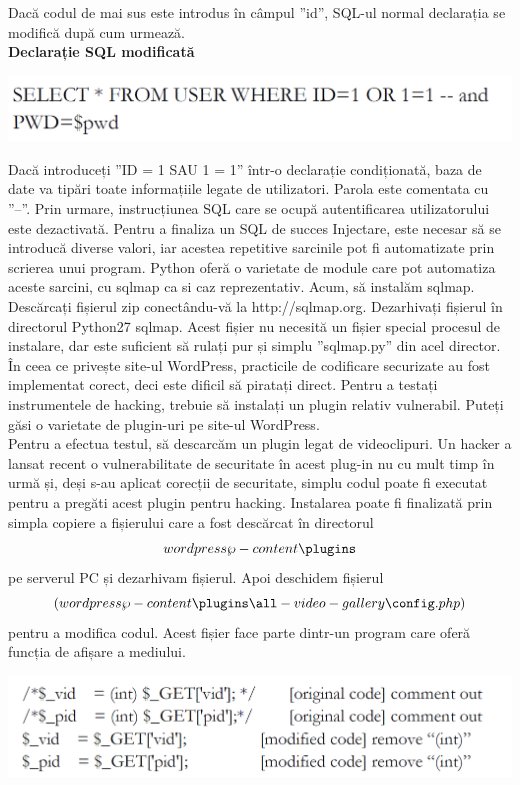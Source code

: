 \documentclass[oneside,20pt]{article}          %
\begin{document}
Dacă codul de mai sus este introdus în câmpul ”id”, SQL-ul normal
declarația se modifică după cum urmează.\\
\textbf{Declarație SQL modificată}\\
\begin{center}
\includegraphics[height = 1 cm]{5.png}
\end{center}
Dacă introduceți ”ID = 1 SAU 1 = 1” într-o declarație condiționată,
baza de date va tipări toate informațiile legate de utilizatori. Parola este
comentata cu ”--”. Prin urmare, instrucțiunea SQL care se ocupă
autentificarea utilizatorului este dezactivată. Pentru a finaliza un SQL de succes
Injectare, este necesar să se introducă diverse valori, iar acestea repetitive
sarcinile pot fi automatizate prin scrierea unui program. Python oferă o
varietate de module care pot automatiza aceste sarcini, cu sqlmap ca si caz reprezentativ.
Acum, să instalăm sqlmap. Descărcați fișierul zip conectându-vă la
http://sqlmap.org. Dezarhivați fișierul în directorul
Python27 sqlmap. Acest fișier nu necesită un fișier special
procesul de instalare, dar este suficient să rulați pur și simplu
”sqlmap.py” din acel director.\\
În ceea ce privește site-ul WordPress, practicile de codificare securizate au fost
implementat corect, deci este dificil să piratați direct. Pentru a
testați instrumentele de hacking, trebuie să instalați un plugin relativ vulnerabil.
Puteți găsi o varietate de plugin-uri pe site-ul WordPress.\\
Pentru a efectua testul, să descarcăm un plugin legat de videoclipuri.
Un hacker a lansat recent o vulnerabilitate de securitate în acest plug-in nu
cu mult timp în urmă și, deși s-au aplicat corecții de securitate, simplu
codul poate fi executat pentru a pregăti acest plugin pentru hacking.
Instalarea poate fi finalizată prin simpla copiere a fișierului care
a fost descărcat în directorul $$wordpress\wp-content\plugins$$ pe serverul PC și dezarhivam fișierul. Apoi deschidem fișierul
$$(wordpress\wp-content\plugins\all-video-gallery\config.php)$$ 
pentru a
modifica codul. Acest fișier face parte dintr-un program care oferă funcția de afișare a mediului.\\
\begin{center}
\includegraphics[height = 1 cm]{6.png}
\end{center}
\end{document}
